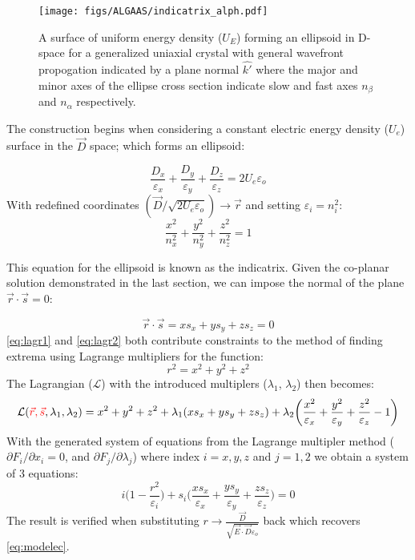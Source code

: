 \begin{figure}[ht!]
\begin{center}
\texttt{[image: figs/ALGAAS/indicatrix\_alph.pdf]}
\end{center}
\caption{A surface of uniform energy density ($U_E$) forming an ellipsoid in D-space for a generalized uniaxial crystal with general wavefront propogation indicated by a plane normal $\hat{k'}$ where the major and minor axes of the ellipse cross section indicate slow and fast axes $n_\beta$ and $n_\alpha$ respectively.}
\label{fig:genindtrx}
\end{figure}

The construction begins when considering a constant electric energy density ($U_e$) surface in the $\vec{D}$ space; which forms an ellipsoid: 

\begin{equation}\label{eq:lagr1}
\frac{D_x}{\varepsilon_x} + \frac{D_y}{\varepsilon_y} + \frac{D_z}{\varepsilon_z} = 2 U_e \varepsilon_o
\end{equation}
With redefined coordinates $(\vec{D}/\sqrt{2 U_e \varepsilon_o}) \rightarrow \vec{r}$ and setting $\varepsilon_i = n^2_i$:
\begin{equation}
\frac{x^2}{n_x^2} + \frac{y^2}{n_y^2} + \frac{z^2}{n_z^2} = 1
\end{equation}

This equation for the ellipsoid is known as the indicatrix. Given the co-planar solution demonstrated in the last section, we can impose the normal of the plane $\vec{r} \cdot \vec{s} = 0$:

\begin{equation}\label{eq:lagr2}
\vec{r} \cdot \vec{s} = x s_x + y s_y + z s_z = 0
\end{equation}
\autoref{eq:lagr1} and \autoref{eq:lagr2} both contribute constraints to the method of finding extrema using Lagrange multipliers for the function:
\begin{equation}
r^2 = x^2 + y^2 + z^2
\end{equation}
The Lagrangian ($\mathcal{L}$) with the introduced multiplers ($\lambda_1$, $\lambda_2$) then becomes:
\begin{equation}
\mathcal{L}(\textcolor{red}{\vec{r},\vec{s}},\lambda_1, \lambda_2) =
x^2 + y^2 + z^2 + \lambda_1 (xs_x + ys_y + zs_z) + \lambda_2 \bigg( \frac{x^2}{\varepsilon_x} + \frac{y^2}{\varepsilon_y} + \frac{z^2}{\varepsilon_z} - 1 \bigg)
\end{equation}
With the generated system of equations from the Lagrange multipler method ($\partial F_i/ \partial x_i = 0$, and $\partial F_j/ \partial \lambda_j$) where index $i =x,y,z$ and $j = 1,2$ we obtain a system of 3 equations:
\begin{equation}
i \bigg(1-\frac{r^2}{\varepsilon_{i}} \bigg) + s_{i} \bigg(\frac{x s_x}{\varepsilon_x} + \frac{y s_y}{\varepsilon_y} + \frac{z s_z}{\varepsilon_z} \bigg) = 0
\end{equation}
The result is verified when substituting $r \rightarrow \frac{\vec{D}}{\sqrt{\vec{E} \cdot \vec{D} \varepsilon_o}}$ back which recovers \autoref{eq:modelec}.
\\
